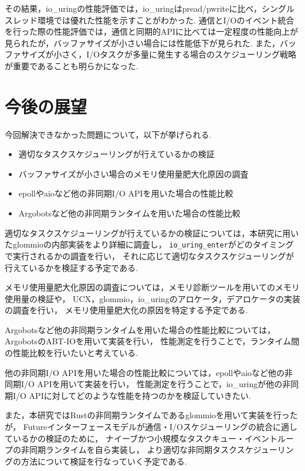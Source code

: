 \documentclass[a4paper,11pt]{jreport}
\begin{document}
その結果，io\_uringの性能評価では，io\_uringはpread/pwriteに比べ，シングルスレッド環境では優れた性能を示すことがわかった.
通信とI/Oのイベント統合を行った際の性能評価では，通信と同期的APIに比べては一定程度の性能向上が見られたが，バッファサイズが小さい場合には性能低下が見られた.
また，バッファサイズが小さく，I/Oタスクが多量に発生する場合のスケジューリング戦略が重要であることも明らかになった.

\section{今後の展望}
今回解決できなかった問題について，以下が挙げられる.

\begin{itemize}
	\item 適切なタスクスケジューリングが行えているかの検証
	\item バッファサイズが小さい場合のメモリ使用量肥大化原因の調査
	\item epollやaioなど他の非同期I/O APIを用いた場合の性能比較
	\item Argobotsなど他の非同期ランタイムを用いた場合の性能比較
\end{itemize}

適切なタスクスケジューリングが行えているかの検証については，本研究に用いたglommioの内部実装をより詳細に調査し，
\lstinline|io_uring_enter|がどのタイミングで実行されるかの調査を行い，
それに応じて適切なタスクスケジューリングが行えているかを検証する予定である.

メモリ使用量肥大化原因の調査については，メモリ診断ツールを用いてのメモリ使用量の検証や，
UCX，glommio，io\_uringのアロケータ，デアロケータの実装の調査を行い，
メモリ使用量肥大化の原因を特定する予定である.

Argobotsなど他の非同期ランタイムを用いた場合の性能比較については，　ArgobotsのABT-IOを用いて実装を行い，
性能測定を行うことで，ランタイム間の性能比較を行いたいと考えている.

他の非同期I/O APIを用いた場合の性能比較については，epollやaioなど他の非同期I/O APIを用いて実装を行い，
性能測定を行うことで，io\_uringが他の非同期I/O APIに対してどのような性能を持つのかを検証していきたい.

また，本研究ではRustの非同期ランタイムであるglommioを用いて実装を行ったが，
Futureインターフェースモデルが通信・I/Oスケジューリングの統合に適しているかの検証のために，
ナイーブかつ小規模なタスクキュー・イベントループの非同期ランタイムを自ら実装し，
より適切な非同期タスクスケジューリングの方法について検証を行なっていく予定である.
\end{document}

